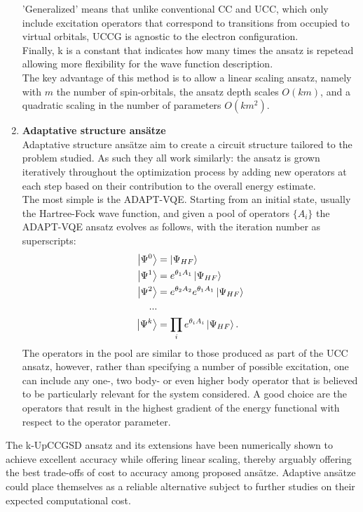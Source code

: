 \begin{enumerate}
    'Generalized' means that unlike conventional CC and UCC, which only include excitation operators that correspond to transitions from occupied to virtual orbitals, UCCG is agnostic to the electron configuration. \\
    Finally, k is a constant that indicates how many times the ansatz is repetead allowing more flexibility for the wave function description. \\
    The key advantage of this method is to allow a linear scaling ansatz, namely with $m$ the number of spin-orbitals, the ansatz depth scales $O(km)$, and a quadratic scaling in the number of parameters $O(km^2)$.
    
    \item \textbf{Adaptative structure ansätze} \\
    Adaptative structure ansätze aim to create a circuit structure tailored to the problem studied. As such they all work similarly: the ansatz is grown iteratively throughout the optimization process by adding new operators at each step based on their contribution to the overall energy estimate. \\
    The most simple is the ADAPT-VQE. Starting from an initial state, usually the Hartree-Fock wave function, and given a pool of operators $\{A_i\}$ the ADAPT-VQE ansatz evolves as follows, with the iteration number as superscripts:
    \begin{align}
        \ket{\Psi^{0}} & = \ket{\Psi_{HF}} \\
        \ket{\Psi^{1}} & = e^{\theta_1 A_1} \ket{\Psi_{HF}} \\
        \ket{\Psi^{2}} & = e^{\theta_2 A_2} e^{\theta_1 A_1} \ket{\Psi_{HF}} \\
        ... \\
        \ket{\Psi^{k}} & = \prod_i e^{\theta_i A_i} \ket{\Psi_{HF}}.
    \end{align}
    The operators in the pool are similar to those produced as part of the UCC ansatz, however, rather than specifying a number of possible excitation, one can include any one-, two body- or even higher body operator that is believed to be particularly relevant for the system considered. A good choice are the operators that result in the highest gradient of the energy functional with respect to the operator parameter.
\end{enumerate}
The k-UpCCGSD ansatz and its extensions have been numerically shown to achieve excellent accuracy while offering linear scaling, thereby arguably offering the best trade-offs of cost to accuracy among proposed ansätze. Adaptive ansätze could place themselves as a reliable alternative subject to further studies on their expected computational cost.

